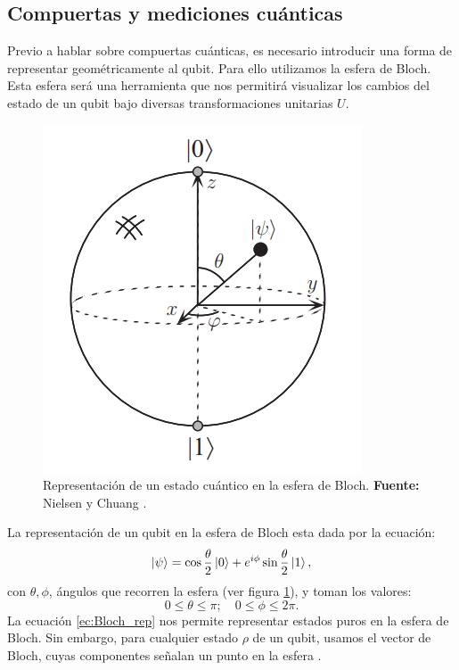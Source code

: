\documentclass[letterpaper,12pt]{thesisECFM}
\theoremstyle{plain}
\theoremstyle{definition}
\theoremstyle{definition}
\theoremstyle{remark}
\newcommand{\1}{\mathbb{1}}
\begin{document}
\subsection{Compuertas y mediciones cuánticas} %

Previo a hablar sobre compuertas cuánticas, es necesario introducir una forma
de representar geométricamente al qubit. Para ello utilizamos la esfera de
Bloch. Esta esfera será una herramienta que nos permitirá visualizar los
cambios del estado de un qubit bajo diversas transformaciones unitarias $U$.

\begin{figure}[h]
    \centering
    \includegraphics[scale=0.70]{imagenes/Bloch.png}
    \caption{Representación de un estado cuántico en la esfera de Bloch.
\textbf{Fuente:} Nielsen y Chuang \cite{nielsen_chuang_2011}.}
    \label{fig:Bloch}
\end{figure}
La representación de un qubit en la esfera de Bloch esta dada por la ecuación: 
\begin{equation}
    \label{ec:Bloch_rep}
    \ket{\psi} = \cos{\frac{\theta}{2}}\ket{0}+ e^{i\phi}\sin{\frac{\theta}{2}}\ket{1},
\end{equation}
con $\theta,\phi$,  ángulos que recorren la esfera (ver figura \ref{fig:Bloch}), y toman los valores:
\begin{equation}
 0 \leq \theta \leq \pi ;  \quad   0 \leq \phi \leq 2\pi.
\end{equation} 
La ecuación \ref{ec:Bloch_rep} nos permite representar estados puros en la esfera de Bloch. Sin embargo, para cualquier estado $\rho$ de un qubit, usamos el vector de Bloch, cuyas componentes señalan un punto en la esfera \cite{princip_quantum}.
\end{document}
